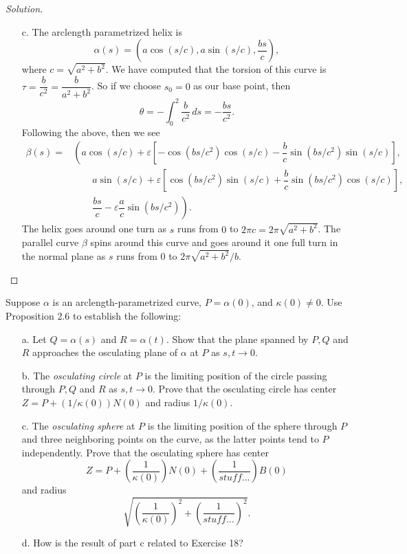 \documentclass[Shifrin_Solutions_Spring_2018]{subfiles}
\begin{document}
\begin{proof}[Solution]
\begin{itemize}
\item[c.] The arclength parametrized helix is
\[
\alpha(s) = \left( a \cos(s/c), a \sin(s/c) , \dfrac{bs}{c} \right),
\]
where $c = \sqrt{a^2+b^2}$.  We have computed that the torsion of this curve is 
$\tau = \dfrac{b}{c^2}= \dfrac{b}{a^2+b^2}$. So if we choose $s_0=0$ as our base point, 
then
\[
\theta = - \int_0^2 \dfrac{b}{c^2} \, ds = -\dfrac{bs}{c^2}.
\]
Following the above, then we see
\[
\begin{split}
\beta(s) = & \left(  a \cos(s/c) +\varepsilon\left[ -\cos(bs/c^2)\cos(s/c) 
  - \dfrac{b}{c}\sin(bs/c^2)\sin(s/c)\right] , \right. \\
& \qquad a \sin(s/c) +\varepsilon \left[ \cos(bs/c^2)\sin(s/c) + \dfrac{b}{c}\sin(bs/c^2)\cos(s/c)\right] , \\
& \qquad \left. \dfrac{bs}{c} - \varepsilon\dfrac{a}{c}\sin(bs/c^2)  \right) .
\end{split}
\]
The helix goes around one turn as $s$ runs from $0$ to $2\pi c = 2\pi\sqrt{a^2+b^2}$. 
The parallel curve $\beta$ spins around this curve and goes around it one full turn 
in the normal plane as $s$ runs from $0$ to $2\pi\sqrt{a^2+b^2}/b$.


\end{itemize}
\end{proof}

\clearpage

\begin{exercise}
Suppose $\alpha$ is an arclength-parametrized curve, 
$P = \alpha(0)$, and $\kappa(0) \neq 0$. Use Proposition 2.6 to establish the following:
\begin{itemize}
\item[a.] Let $Q = \alpha(s)$ and $R = \alpha(t)$. Show that the plane spanned by 
$P, Q$ and $R$ approaches the osculating plane of $\alpha$ at $P$ as $s,t\rightarrow 0$.
\item[b.] The \emph{osculating circle} at $P$ is the limiting position of the circle 
passing through $P, Q$ and $R$ as $s,t \rightarrow 0$. Prove that the osculating circle 
has center $Z = P + (1/\kappa(0)) N(0)$ and radius $1/\kappa(0)$.
\item[c.] The \emph{osculating sphere} at $P$ is the limiting position of the sphere 
through $P$ and three neighboring points on the curve, as the latter points tend to $P$ 
independently. Prove that the osculating sphere has center
\[
Z= P + \left( \dfrac{1}{\kappa(0)}\right) N(0) + \left(  \dfrac{1}{stuff...}  \right) B(0)
\]
and radius
\[
\sqrt{  \left( \dfrac{1}{\kappa(0)}\right)^2  + \left(  \dfrac{1}{stuff...}  \right)^2 } .
\]
\item[d.] How is the result of part c related to Exercise 18?
\end{itemize}
\end{exercise}
\end{document}
